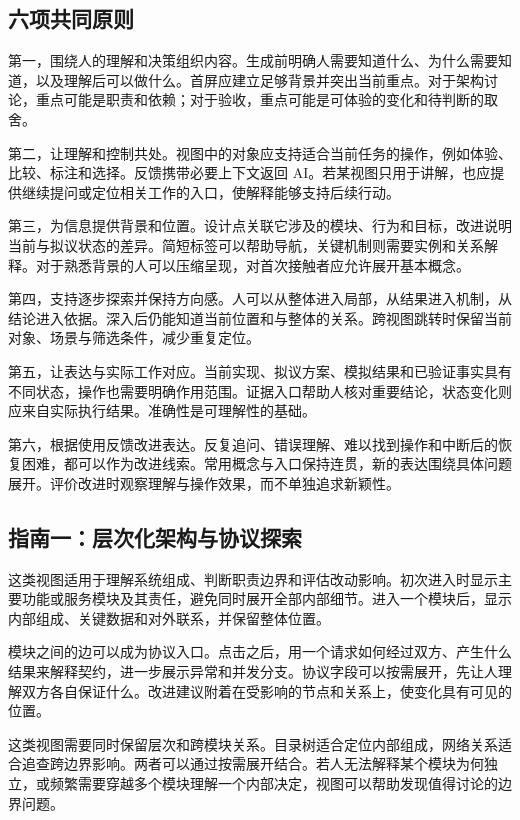 \label{sec:guidelines}
\subsection{六项共同原则}
第一，围绕人的理解和决策组织内容。生成前明确人需要知道什么、为什么需要知道，以及理解后可以做什么。首屏应建立足够背景并突出当前重点。对于架构讨论，重点可能是职责和依赖；对于验收，重点可能是可体验的变化和待判断的取舍。

第二，让理解和控制共处。视图中的对象应支持适合当前任务的操作，例如体验、比较、标注和选择。反馈携带必要上下文返回 AI。若某视图只用于讲解，也应提供继续提问或定位相关工作的入口，使解释能够支持后续行动。

第三，为信息提供背景和位置。设计点关联它涉及的模块、行为和目标，改进说明当前与拟议状态的差异。简短标签可以帮助导航，关键机制则需要实例和关系解释。对于熟悉背景的人可以压缩呈现，对首次接触者应允许展开基本概念。

第四，支持逐步探索并保持方向感。人可以从整体进入局部，从结果进入机制，从结论进入依据。深入后仍能知道当前位置和与整体的关系。跨视图跳转时保留当前对象、场景与筛选条件，减少重复定位。

第五，让表达与实际工作对应。当前实现、拟议方案、模拟结果和已验证事实具有不同状态，操作也需要明确作用范围。证据入口帮助人核对重要结论，状态变化则应来自实际执行结果。准确性是可理解性的基础。

第六，根据使用反馈改进表达。反复追问、错误理解、难以找到操作和中断后的恢复困难，都可以作为改进线索。常用概念与入口保持连贯，新的表达围绕具体问题展开。评价改进时观察理解与操作效果，而不单独追求新颖性。

\subsection{指南一：层次化架构与协议探索}
这类视图适用于理解系统组成、判断职责边界和评估改动影响。初次进入时显示主要功能或服务模块及其责任，避免同时展开全部内部细节。进入一个模块后，显示内部组成、关键数据和对外联系，并保留整体位置。

模块之间的边可以成为协议入口。点击之后，用一个请求如何经过双方、产生什么结果来解释契约，进一步展示异常和并发分支。协议字段可以按需展开，先让人理解双方各自保证什么。改进建议附着在受影响的节点和关系上，使变化具有可见的位置。


这类视图需要同时保留层次和跨模块关系。目录树适合定位内部组成，网络关系适合追查跨边界影响。两者可以通过按需展开结合。若人无法解释某个模块为何独立，或频繁需要穿越多个模块理解一个内部决定，视图可以帮助发现值得讨论的边界问题。

